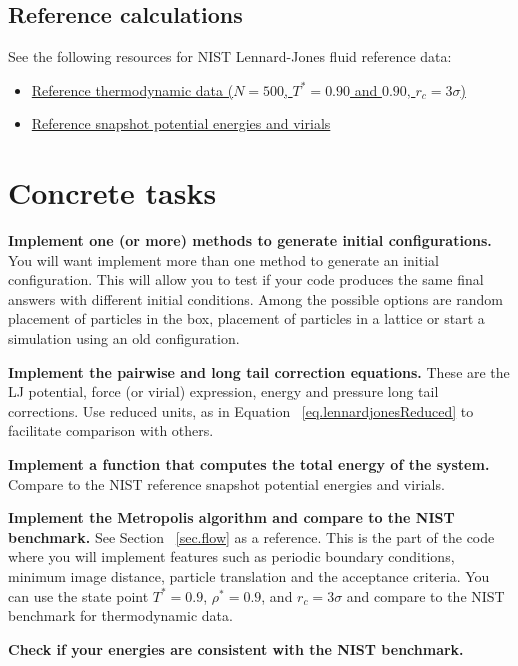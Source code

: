 \documentclass[aip,jcp,preprint,superscriptaddress,floatfix]{revtex4-1}
\begin{document}
\subsection{Reference calculations}

See the following resources for NIST Lennard-Jones fluid reference data:
\begin{itemize}
\item \href{https://mmlapps.nist.gov/srs/LJ_PURE/mc.htm}{Reference thermodynamic data ($N=500$, $T^*=0.90$ and $0.90$, $r_c = 3\sigma$)}
\item \href{https://www.nist.gov/mml/csd/chemical-informatics-research-group/lennard-jones-fluid-reference-calculations}{Reference snapshot potential energies and virials}
\end{itemize}

\section{Concrete tasks}

\textbf{Implement one (or more) methods to generate initial configurations. }
You will want implement more than one method to generate an initial
configuration. This will allow you to test if your code produces the same
final answers with different initial conditions. Among the possible options
are random placement of particles in the box, placement of particles in a
lattice or start a simulation using an old configuration.

\textbf{Implement the pairwise and long tail correction equations. } 
These are the LJ potential, force (or virial) expression, energy and 
pressure long tail corrections. Use reduced units, 
as in Equation ~\ref{eq.lennardjonesReduced} to facilitate comparison with
others.

\textbf{Implement a function that computes the total energy of the system. } 
Compare to the NIST reference snapshot potential energies and virials.

\textbf{Implement the Metropolis algorithm and compare to the NIST
benchmark. } See Section ~\ref{sec.flow} as
a reference. This is the part of the code where you will implement
features such as periodic boundary conditions, minimum image distance, 
particle translation and the acceptance criteria. You can use the state point
$T^* = 0.9$, $\rho^* = 0.9$, and $r_c = 3\sigma$  and compare to the
NIST benchmark for thermodynamic data.

\textbf{Check if your energies are consistent with the NIST benchmark. }


\newpage
%


\end{document}
